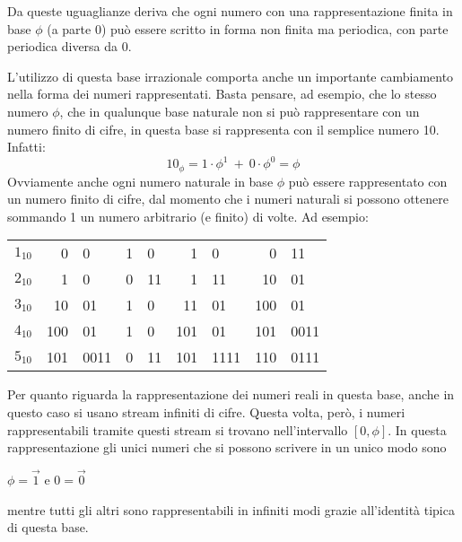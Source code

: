 \documentclass[Lau]{sapthesis}
\begin{document}
Da queste uguaglianze deriva che ogni numero con una rappresentazione finita in base $\phi$ (a parte 0) può essere scritto in forma non finita ma periodica, con parte periodica diversa da 0.

\medskip

L'utilizzo di questa base irrazionale comporta anche un importante cambiamento nella forma dei numeri rappresentati. Basta pensare, ad esempio, che lo stesso numero $\phi$, che in qualunque base naturale non si può rappresentare con un numero finito di cifre, in questa base si rappresenta con il semplice numero 10. Infatti:
$$10_\phi = 1 \cdot \phi^1 \ + \ 0 \cdot \phi^0 = \phi$$
Ovviamente anche ogni numero naturale in base $\phi$ può essere rappresentato con un numero finito di cifre, dal momento che i numeri naturali si possono ottenere sommando 1 un numero arbitrario (e finito) di volte. Ad esempio:
\begin{center}
\begin{tabular}{c@{ = }r@{.}l@{ + }r@{.}l@{ = }r@{.}l@{ = }r@{.}l}
$1_{10}$ & 0 & 0 & 1 & 0 & 1 & 0 & 0 & 11\\
$2_{10}$ & 1 & 0 & 0 & 11 & 1 & 11 & 10 & 01\\
$3_{10}$ & 10 & 01 & 1 & 0 & 11 & 01 & 100 & 01\\
$4_{10}$ & 100 & 01 & 1 & 0 & 101 & 01 & 101 & 0011\\
$5_{10}$ & 101 & 0011 & 0 & 11 & 101 & 1111 & 110 & 0111
\end{tabular}
\end{center}

\medskip

Per quanto riguarda la rappresentazione dei numeri reali in questa base, anche in questo caso si usano stream infiniti di cifre. Questa volta, però, i numeri rappresentabili tramite questi stream si trovano nell'intervallo $\left[0,\phi\right]$. In questa rappresentazione gli unici numeri che si possono scrivere in un unico modo sono
\begin{center}
$\phi = \overrightarrow{1}$ \hspace{0.5cm} e \hspace{0.5cm} $0 = \overrightarrow{0}$
\end{center}
mentre tutti gli altri sono rappresentabili in infiniti modi grazie all'identità tipica di questa base.
\end{document}
